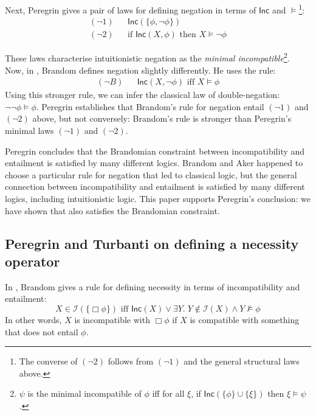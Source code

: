 Next, Peregrin gives a pair of laws for defining negation in terms
of $\mathsf{Inc}$ and $\models$\footnote{The converse of $(\neg 2)$
  follows from $(\neg 1)$ and the general structural laws above.}:
\begin{eqnarray*}
  (\neg 1) & & \mathsf{Inc}(\{\phi, \neg \phi\}) \\
  (\neg 2) & & \text{if } \mathsf{Inc}(X, \phi) \text{ then } X \models \neg \phi
\end{eqnarray*}

\NI These laws characterise intuitionistic negation as the
\emph{minimal incompatible}\footnote{$\psi$ is the minimal
  incompatible of $\phi$ iff for all $\xi$, if $\mathsf{Inc}(\{\phi\}
  \cup \{\xi\})$ then $\xi \models \psi$.}.  
  Now, in \cite{brandom},
Brandom defines negation slightly differently. He uses the rule:
\begin{eqnarray*}
  (\neg B) & &\mathsf{Inc}(X, \neg \phi) \text{ iff } X \models \phi
\end{eqnarray*}
Using this stronger rule, we can infer the classical law of
double-negation: $\neg \neg \phi \models \phi$.  Peregrin establishes
that Brandom's rule for negation entail $(\neg 1)$ and $(\neg 2)$
above, but not conversely: Brandom's rule is stronger than Peregrin's
minimal laws $(\neg 1)$ and $(\neg 2)$.

Peregrin concludes that the Brandomian constraint between
incompatibility and entailment is satisfied by many different logics.
Brandom and Aker happened to choose a particular rule for negation
that led to classical logic, but the general connection between
incompatibility and entailment is satisfied by many different logics,
including intuitionistic logic.  This paper supports Peregrin's
conclusion: we have shown that \cathoristic{} also satisfies the
Brandomian constraint.

\subsection{Peregrin and Turbanti on defining a necessity operator}\label{peregrinTurbanti}

In \cite{brandom}, Brandom gives a rule for defining necessity in terms of incompatibility and entailment:
\[
X \in \mathcal{I}(\{\Box \phi\}) \text{ iff } \mathsf{Inc}(X) \lor \exists Y . \; Y \notin \mathcal{I}(X) \land Y \nvDash \phi
\]
In other words, $X$ is incompatible with $\Box \phi$ if $X$ is compatible with something that does not entail $\phi$.

